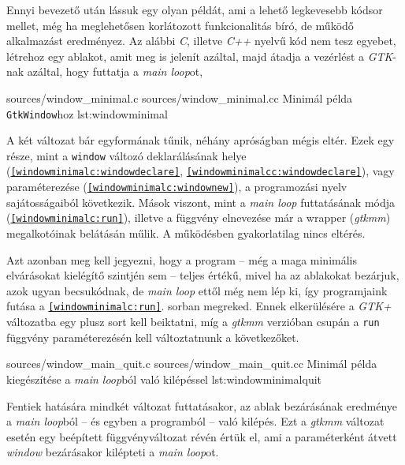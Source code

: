 Ennyi bevezető után lássuk egy olyan példát, ami a lehető legkevesebb kódsor mellet, még ha meglehetősen korlátozott funkcionalitás bíró, de működő alkalmazást eredményez. Az alábbi \textit{C}, illetve \textit{C++} nyelvű kód nem tesz egyebet, létrehoz egy ablakot, amit meg is jelenít azáltal, majd átadja a vezérlést a \textit{GTK}-nak azáltal, hogy futtatja a \textit{main loop}ot, 

\lstinputsources
{sources/window_minimal.c}
{sources/window_minimal.cc}
{Minimál példa \texttt{GtkWindow}hoz}
{lst:windowminimal}

A két változat bár egyformának tűnik, néhány apróságban mégis eltér. Ezek egy része, mint a \texttt{window} változó deklarálásának helye (\texttt{\ref{windowminimalc:windowdeclare}}, \texttt{\ref{windowminimalcc:windowdeclare}}), vagy paraméterezése (\texttt{\ref{windowminimalc:windownew}}), a programozási nyelv sajátosságaiból következik. Mások viszont, mint a \textit{main loop} futtatásának módja (\texttt{\ref{windowminimalc:run}}), illetve a függvény elnevezése már a wrapper (\textit{gtkmm}) megalkotóinak belátásán műlik. A működésben gyakorlatilag nincs eltérés.

Azt azonban meg kell jegyezni, hogy a program -- még a maga minimális elvárásokat kielégítő szintjén sem -- teljes értékű, mivel ha az ablakokat bezárjuk, azok ugyan becsukódnak, de \textit{main loop} ettől még nem lép ki, így programjaink futása a \texttt{\ref{windowminimalc:run}}. sorban megreked. Ennek elkerülésére a \textit{GTK+} változatba egy plusz sort kell beiktatni, míg a \textit{gtkmm} verzióban csupán a \texttt{run} függvény paraméterezésén kell változtatnunk a következőket.

\lstinputsources
{sources/window_main_quit.c}
{sources/window_main_quit.cc}
{Minimál példa kiegészítése a \textit{main loop}ból való kilépéssel}
{lst:windowminimalquit}

Fentiek hatására mindkét változat futtatásakor, az ablak bezárásának eredménye a \textit{main loop}ból -- és egyben a programból -- való kilépés. Ezt a \textit{gtkmm} változat esetén egy beépített függvényváltozat révén értük el, ami a paraméterként átvett \textit{window} bezárásakor kilépteti a \textit{main loop}ot.

